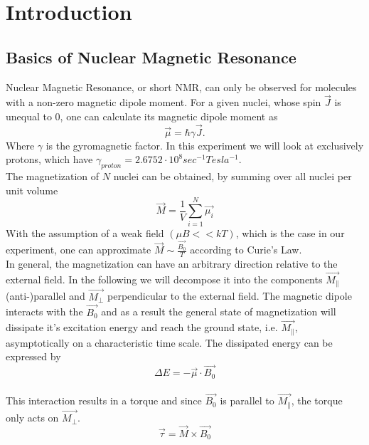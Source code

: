 \section{Introduction}\label{intro}
\subsection{Basics of Nuclear Magnetic Resonance}\label{basics}
Nuclear Magnetic Resonance, or short NMR, can only be observed for molecules with a non-zero magnetic dipole moment. For a given nuclei, whose spin $\vec{J}$ is unequal to 0, one can calculate its magnetic dipole moment as
\begin{equation}
	\label{1}
	\vec{\mu} = \hbar \gamma \vec{J}.
\end{equation}
Where $\gamma$ is the gyromagnetic factor. In this experiment we will look at exclusively protons, which have $\gamma_{proton} = 2.6752 \cdot 10^8 sec^{-1} Tesla^{-1}$.
\vspace{3mm} \\
The magnetization of $N$ nuclei can be obtained, by summing over all nuclei per unit volume
\begin{equation}
	\label{2}
	\vec{M} = \dfrac{1}{V} \sum^{N}_{i=1} \vec{\mu_i}
\end{equation}
With the assumption of a weak field $(\mu B << kT)$, which is the case in our experiment, one can approximate $\vec{M} \sim \frac{\vec{B_{0}}}{T}$ according to Curie's Law. 
\vspace{5mm} \\
In general, the magnetization can have an arbitrary direction relative to the external field. In the following we will decompose it into the components $\vec{M_{\parallel}}$ (anti-)parallel and $\vec{M_{\perp}}$ perpendicular to the external field. 
The magnetic dipole interacts with the $\vec{B_{0}}$ and as a result the general state of magnetization will dissipate it's excitation energy and reach the ground state, i.e. $\vec{M_{\parallel}}$, asymptotically on a characteristic time scale. The dissipated energy can be expressed by
\begin{equation}
	\label{5}
	\Delta E = - \vec{\mu} \cdot \vec{B_0}
\end{equation}
\vspace{3mm} \\
This interaction results in a torque and since $\vec{B_{0}}$ is parallel to $\vec{M_{\parallel}}$, the torque only acts on $\vec{M_{\perp}}$.
\begin{equation}
	\label{6}
	\vec{\tau} = \vec{M} \times \vec{B_{0}}
\end{equation}
